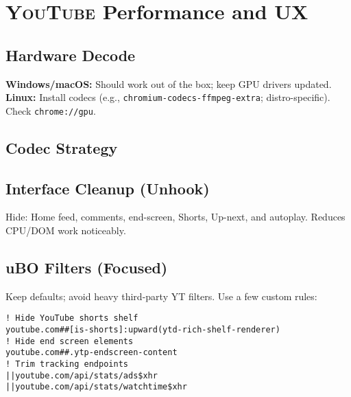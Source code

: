 \documentclass[10pt,a4paper,oneside]{book}
\newcommand{\youtube}{\textsc{YouTube}}
\newcommand{\keystroke}[1]{\texttt{\color{accentred}#1}}
\begin{document}
\chapter{\youtube{} Performance and UX}
\section{Hardware Decode}
\textbf{Windows/macOS:} Should work out of the box; keep GPU drivers updated.\\
\textbf{Linux:} Install codecs (e.g., \texttt{chromium-codecs-ffmpeg-extra}; distro-specific). Check \keystroke{chrome://gpu}.

\section{Codec Strategy}

\section{Interface Cleanup (Unhook)}
Hide: Home feed, comments, end-screen, Shorts, Up-next, and autoplay. Reduces CPU/DOM work noticeably.

\section{uBO Filters (Focused)}
Keep defaults; avoid heavy third-party YT filters. Use a few custom rules:
\begin{codebox}
\begin{lstlisting}
! Hide YouTube shorts shelf
youtube.com##[is-shorts]:upward(ytd-rich-shelf-renderer)
! Hide end screen elements
youtube.com##.ytp-endscreen-content
! Trim tracking endpoints
||youtube.com/api/stats/ads$xhr
||youtube.com/api/stats/watchtime$xhr
\end{lstlisting}
\end{codebox}
\end{document}
